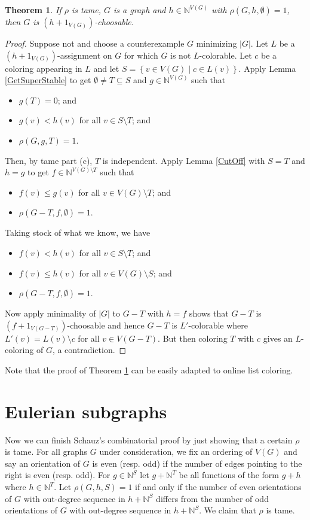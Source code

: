 \documentclass[12pt]{article}
\theoremstyle{plain}
\newtheorem{thm}{Theorem}[section]
\theoremstyle{definition}
\theoremstyle{remark}
\newcommand{\IN}{\mathbb{N}}
\newcommand{\setb}[3]{\left\{ #1 \in #2 \mid #3 \right\}}
\newcommand{\card}[1]{\left|#1\right|}
\begin{document}
\begin{thm}\label{TameRhoWins}
	If $\rho$ is tame, $G$ is a graph and $h \in \IN^{V(G)}$ with $\rho(G, h, \emptyset) = 1$, then $G$ is $(h + 1_{V(G)})$-choosable.
\end{thm}
\begin{proof}
	Suppose not and choose a counterexample $G$ minimizing $\card{G}$.  Let $L$ be a $(h + 1_{V(G)})$-assignment on $G$ for which $G$ is not $L$-colorable.  Let $c$ be a coloring appearing in $L$ and let $S = \setb{v}{V(G)}{c \in L(v)}$.  Apply Lemma \ref{GetSuperStable} to get $\emptyset \ne T \subseteq S$ and $g \in \IN^{V(G)}$ such that
	\begin{itemize}
		\item $g(T) = 0$; and
		\item $g(v) < h(v)$ for all $v \in S\setminus T$; and
		\item $\rho(G, g, T) = 1$.
	\end{itemize}
	Then, by tame part (c), $T$ is independent.  Apply Lemma \ref{CutOff} with $S = T$ and $h = g$ to get $f \in \IN^{V(G) \setminus T}$ such that
		\begin{itemize}
			\item $f(v) \le g(v)$ for all $v \in V(G) \setminus T$; and
			\item $\rho(G - T, f, \emptyset) = 1$.
		\end{itemize}
	Taking stock of what we know, we have
		\begin{itemize}
			\item $f(v) < h(v)$ for all $v \in S \setminus T$; and
			\item $f(v) \le h(v)$ for all $v \in V(G) \setminus S$; and
			\item $\rho(G - T, f, \emptyset) = 1$.
		\end{itemize}
		
	Now apply minimality of $|G|$ to $G-T$ with $h = f$ shows that $G-T$ is $(f + 1_{V(G-T)})$-choosable and hence $G-T$ is $L'$-colorable where $L'(v) = L(v) \setminus c$ for all $v \in V(G-T)$.  But then coloring $T$ with $c$ gives an $L$-coloring of $G$, a contradiction.
\end{proof}

Note that the proof of Theorem \ref{TameRhoWins} can be easily adapted to online list coloring.

\section{Eulerian subgraphs}
Now we can finish Schauz's combinatorial proof by just showing that a certain $\rho$ is tame.  For all graphs $G$ under consideration, we fix an ordering of $V(G)$ and say an orientation of $G$ is even (resp. odd) if the number of edges pointing to the right is even (resp. odd).  For $g \in \IN^S$ let $g + \IN^T$ be all functions of the form $g + h$ where $h \in \IN^T$. Let $\rho(G, h, S) = 1$ if and only if the number of even orientations of $G$ with out-degree sequence in $h + \IN^S$ differs from the number of odd orientations of $G$ with out-degree sequence in $h + \IN^S$.  We claim that $\rho$ is tame.  
\end{document}
